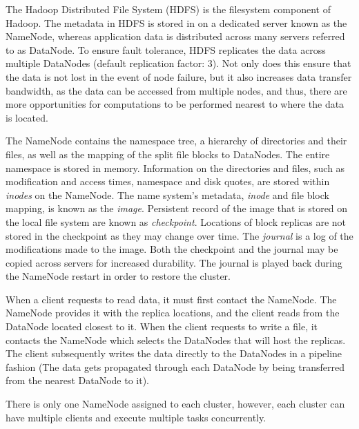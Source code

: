 \documentclass{report}
\begin{document}
        The Hadoop Distributed File System (HDFS)\cite{hadoop} is the filesystem
        component of Hadoop. The metadata in HDFS is stored in on a dedicated
        server known as the NameNode, whereas application data is distributed
        across many servers referred to as DataNode. To ensure fault tolerance,
        HDFS replicates the data across multiple DataNodes (default replication
        factor: 3). Not only does this ensure that the data is not lost in the
        event of node failure, but it also increases data transfer bandwidth, as
        the data can be accessed from multiple nodes, and thus, there are more
        opportunities for computations to be performed nearest to where the data
        is located. 

        The NameNode contains the namespace tree, a hierarchy of directories and
        their files, as well as the mapping of the split file blocks to
        DataNodes. The entire namespace is stored in memory. Information on the
        directories and files, such as modification and access times, namespace
        and disk quotes, are stored within \textit{inodes} on the NameNode.  The
        name system's metadata, \textit{inode} and file block mapping, is known
        as the \textit{image}. Persistent record of the image that is stored on
        the local file system are known as \textit{checkpoint}. Locations of
        block replicas are not stored in the checkpoint as they may change over
        time. The \textit{journal} is a log of the modifications made to the
        image. Both the checkpoint and the journal may be copied across servers
        for increased durability. The journal is played back during the NameNode
        restart in order to restore the cluster.

        When a client requests to read data, it must first contact the NameNode.
        The NameNode provides it with the replica locations, and the client
        reads from the DataNode located closest to it. When the client requests
        to write a file, it contacts the NameNode which selects the DataNodes
        that will host the replicas. The client subsequently writes the data
        directly to the DataNodes in a pipeline fashion (The data gets
        propagated through each DataNode by being transferred from the nearest
        DataNode to it).

        There is only one NameNode assigned to each cluster, however, each
        cluster can have multiple clients and execute multiple tasks
        concurrently.
\end{document}
